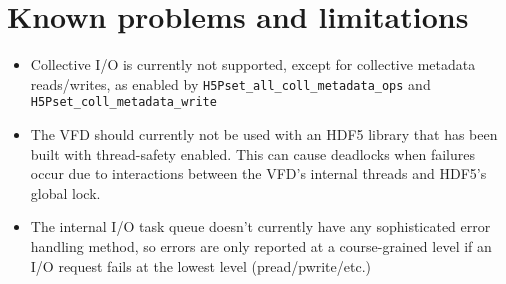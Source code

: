 \documentclass[../main.tex]{subfiles}
\begin{document}
\newpage

\section{Known problems and limitations}

\begin{itemize}
  \item Collective I/O is currently not supported, except for collective metadata
        reads/writes, as enabled by \texttt{H5Pset\_all\_coll\_metadata\_ops} and
        \texttt{H5Pset\_coll\_metadata\_write}

  \item The VFD should currently not be used with an HDF5 library that has been
        built with thread-safety enabled. This can cause deadlocks when failures
        occur due to interactions between the VFD's internal threads and HDF5's
        global lock.

  \item The internal I/O task queue doesn't currently have any sophisticated error handling
        method, so errors are only reported at a course-grained level if an I/O request
        fails at the lowest level (pread/pwrite/etc.)
\end{itemize}
\end{document}
